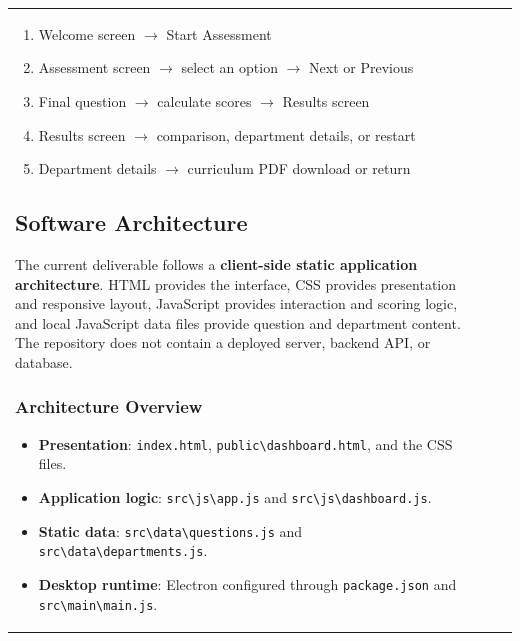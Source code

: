 \documentclass[12pt, a4paper]{article}
\begin{document}
\begin{itemize}[leftmargin=1.5em, itemsep=3pt]
\begin{table}[H]
\begin{tabularx}{\textwidth}{>{\raggedright\arraybackslash}p{0.8cm}>{\raggedright\arraybackslash}p{3.5cm}>{\raggedright\arraybackslash}X>{\raggedright\arraybackslash}p{2.5cm}}
\begin{enumerate}[leftmargin=1.5em, itemsep=3pt]
    \item Welcome screen $\rightarrow$ Start Assessment
    \item Assessment screen $\rightarrow$ select an option $\rightarrow$ Next or Previous
    \item Final question $\rightarrow$ calculate scores $\rightarrow$ Results screen
    \item Results screen $\rightarrow$ comparison, department details, or restart
    \item Department details $\rightarrow$ curriculum PDF download or return
\end{enumerate}

\subsection{Software Architecture}

The current deliverable follows a \textbf{client-side static application architecture}. HTML provides the interface, CSS provides presentation and responsive layout, JavaScript provides interaction and scoring logic, and local JavaScript data files provide question and department content. The repository does not contain a deployed server, backend API, or database.

\subsubsection*{Architecture Overview}

\begin{itemize}[leftmargin=1.5em, itemsep=3pt]
    \item \textbf{Presentation}: \texttt{index.html}, \texttt{public\textbackslash dashboard.html}, and the CSS files.
    \item \textbf{Application logic}: \texttt{src\textbackslash js\textbackslash app.js} and \texttt{src\textbackslash js\textbackslash dashboard.js}.
    \item \textbf{Static data}: \texttt{src\textbackslash data\textbackslash questions.js} and \texttt{src\textbackslash data\textbackslash departments.js}.
    \item \textbf{Desktop runtime}: Electron configured through \texttt{package.json} and \texttt{src\textbackslash main\textbackslash main.js}.
\end{itemize}


\end{tabularx}
\end{table}
\end{itemize}
\end{document}
